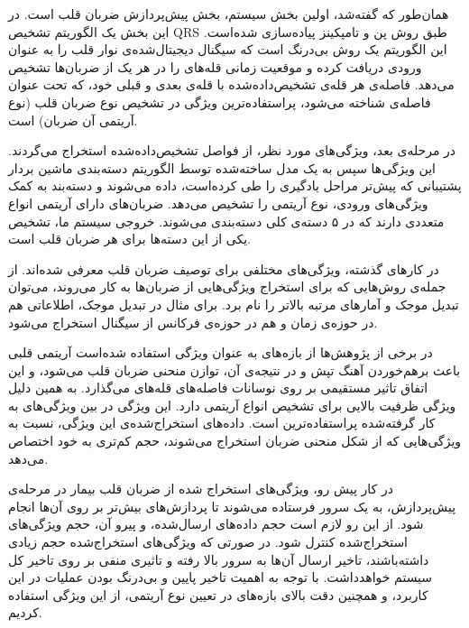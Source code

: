 همان‌طور که گفته‌شد، اولین بخش سیستم، بخش پیش‌پردازش ضربان قلب است. در این بخش یک الگوریتم تشخیص QRS طبق روش پن و تامپکینز \cite{Pan1985} پیاده‌سازی شده‌است. این الگوریتم یک روش بی‌درنگ است که سیگنال دیجیتال‌شده‌ی نوار قلب را به عنوان ورودی دریافت کرده و موقعیت زمانی قله‌های  را در هر یک از ضربان‌ها تشخیص می‌دهد. فاصله‌ی هر قله‌ی  تشخیص‌داده‌شده با قله‌ی بعدی و قبلی خود، که تحت عنوان فاصله‌ی  شناخته می‌شود، پراستفاده‌ترین ویژگی در تشخیص نوع ضربان قلب (نوع آریتمی آن ضربان) است. \cite{ECGSurvey}
 
در مرحله‌ی بعد، ویژگی‌های  مورد نظر، از فواصل  تشخیص‌داده‌شده استخراج می‌گردند. این ویژگی‌ها سپس به یک مدل ساخته‌شده توسط الگوریتم دسته‌بندی ماشین بردار پشتیبانی  که پیش‌تر مراحل یادگیری را طی کرده‌است، داده می‌شوند و دسته‌بند به کمک ویژگی‌های ورودی، نوع آریتمی را تشخیص می‌دهد. ضربان‌های دارای آریتمی انواع متعددی دارند که در ۵ دسته‌ی کلی دسته‌بندی می‌شوند. \cite{ECGSurvey} خروجی سیستم ما، تشخیص یکی از این دسته‌ها برای هر ضربان قلب است.

در کارهای گذشته، ویژگی‌های مختلفی برای توصیف ضربان قلب معرفی شده‌اند. از جمله‌ی   روش‌هایی که برای استخراج ویژگی‌هایی از ضربان‌ها به کار می‌روند، می‌توان تبدیل موجک  \cite{Mar2011, Al-Fahoum1999} و آمارهای مرتبه بالاتر  \cite{Osowski2001, Lannoy2010} را نام برد. برای مثال در تبدیل موجک، اطلاعاتی هم در حوزه‌ی زمان و هم در حوزه‌ی فرکانس از سیگنال استخراج می‌شود.
 
در برخی از پژوهش‌ها از بازه‌های  به عنوان ویژگی استفاده شده‌است \cite{Exarchos2005, Exarchos2007, Kumar2013} آریتمی قلبی باعث برهم‌خوردن آهنگ تپش و در نتیجه‌ی آن، توازن منحنی ضربان قلب می‌شود، و این اتفاق تاثیر مستقیمی بر روی نوسانات فاصله‌های قله‌های   می‌گذارد. \cite{Dotsinsky2007} به همین دلیل ویژگی  ظرفیت بالایی برای تشخیص انواع آریتمی دارد. این ویژگی در بین ویژگی‌های به کار گرفته‌شده پراستفاده‌ترین است. \cite{ECGSurvey}
داده‌های استخراج‌شده‌ی این ویژگی، نسبت به ویژگی‌هایی که از شکل منحنی ضربان استخراج می‌شوند، حجم کم‌تری به خود اختصاص می‌دهد. 

در کار پیش رو، ویژگی‌های استخراج شده از ضربان قلب بیمار در مرحله‌ی پیش‌پردازش، به یک سرور فرستاده می‌شوند تا پردازش‌های بیش‌تر بر روی آن‌ها انجام شود. از این رو لازم است حجم داده‌های ارسال‌شده، و پیرو آن، حجم ویژگی‌های استخراج‌شده کنترل شود. در صورتی که ویژگی‌های استخراج‌شده حجم زیادی داشته‌باشند، تاخیر ارسال آن‌ها به سرور بالا رفته و تاثیری منفی بر روی تاخیر کل سیستم خواهدداشت. با توجه به اهمیت تاخیر پایین و بی‌درنگ بودن عملیات در این کاربرد، و همچنین دقت بالای بازه‌های در تعیین نوع آریتمی، از این ویژگی استفاده کردیم. 

